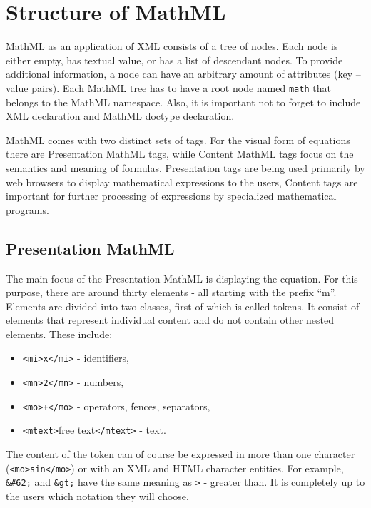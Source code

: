 \documentclass[11pt,oneside,final]{fithesis2}
\begin{document}
\section{Structure of MathML}
MathML as an application of XML consists of a tree of nodes. Each node is either empty, has textual value, or has a list of descendant nodes. To provide additional information, a node can have an arbitrary amount of attributes (key – value pairs). Each MathML tree has to have a root node named \texttt{math} that belongs to the MathML namespace. Also, it is important not to forget to include XML declaration and MathML doctype declaration. 

MathML comes with two distinct sets of tags. For the visual form of equations there are Presentation MathML tags, while Content MathML tags focus on the semantics and meaning of formulas. Presentation tags are being used primarily by web browsers to display mathematical expressions to the users, Content tags are important for further processing of expressions by specialized mathematical programs.

\subsection{Presentation MathML}
The main focus of the Presentation MathML is displaying the equation. For this purpose, there are around thirty elements - all starting with the prefix “m”. Elements are divided into two classes, first of which is called tokens. It consist of elements that represent individual content and do not contain other nested elements. These include: 
\begin{itemize}
\item \texttt{<mi>x</mi>} - identifiers,
\item \texttt{<mn>2</mn>} - numbers,
\item \texttt{<mo>+</mo>} - operators, fences, separators,
\item \texttt{<mtext>}free text\texttt{</mtext>} - text.
\end{itemize}
The content of the token can of course be expressed in more than one character (\texttt{<mo>sin</mo>}) or with an XML and HTML character entities. For example, \texttt{\&\#62;} and \texttt{\&gt;} have the same meaning as \texttt{>} - greater than. It is completely up to the users which notation they will choose.
\end{document}

